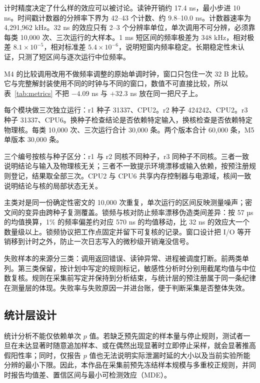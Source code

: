 计时精度决定了什么样的效应可以被讨论。读钟开销约 17.4 ns，最小步进 10 ns。时间戳计数器的分辨率下界为 42--43 个计数、约 9.8--10.0 ns。计数器速率为 4,291,962 kHz。32 ns 的效应只有 2--3 个分辨率单位，单次调用不可分辨，必须靠每类 10,000 次、三次运行的大样本。1 ms 短区间的频率极差为 348 kHz，相对极差 $8.1\times10^{-5}$，相对标准差 $5.4\times10^{-6}$，说明短窗内频率稳定。长期稳定性未认证，只测了短区间与逐次运行中位频率。 %

M4 的比较调用改用不做频率调整的原始单调时钟，窗口只包住一次 32 B 比较。它与完整解封装使用不同的时钟与不同的窗口，数值不可直接比较，所以表~\ref{tab:metrics} 不把 $-4.09$ ns 与 $+32.3$ ns 放在同一把尺子上。

每个模块做三次独立运行：r1 种子 31337、CPU2。r2 种子 424242、CPU2。r3 种子 31337、CPU6。换种子检查结论是否依赖特定输入，换核检查是否依赖特定物理核。每类 10,000 次、三次运行合计 30,000 条。两个版本合计 60,000 条，M5 单版本 30,000 条。 %

三个编号按核与种子区分：r1 与 r2 同核不同种子，r3 同种子不同核。三者一致说明结论与输入及物理核无关；三者不一致提示环境漂移或输入依赖，按预注册规则登记，结果取全部三次。CPU2 与 CPU6 共享内存控制器与电源域，核间一致说明结论与核的局部状态无关。

主类对是同一份确定性密文的 10,000 次重复，单次运行的区间反映测量噪声；密文间的变异由跨种子复测覆盖。锁频与核对防止频率漂移伪造类间差异：按 57 µs 的均值换算，1\% 的频率偏差约对应 570 ns 的均值移动，比 32 ns 的效应大一个数量级以上。锁频协议把工作点固定并留下可复核的记录。窗口设计把 I/O 等开销移到计时之外，防止一次日志写入的微秒级开销淹没信号。

失败样本的来源分三类：调用返回错误、读钟异常、进程被调度打断。前两类单列。第三类保留，按计划中写定的规则标记，敏感性分析时分别用截尾均值与中位数复核。规则在采集前写定并保持到分析结束，与统计层的预注册属于同一条纪律在测量层的体现。失败率与失败原因一并进台账，便于判断采集是否整体失效。

\subsection{统计层设计}

统计分析不能仅依赖单次 $p$ 值。若缺乏预先固定的样本量与停止规则，测试者一旦在未达显著时随意追加样本、或在偶然出现显著时立即停止采样，就会显著推高假阳性率；同时，仅报告 $p$ 值也无法说明实际泄漏时延的大小以及当前实验所能分辨的最小下限。因此，本作品在采集前预先冻结样本规模与多重校正规则，并同时报告均值差、置信区间与最小可检测效应（MDE）。

